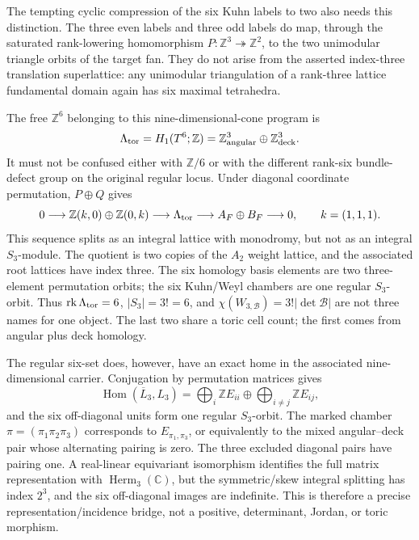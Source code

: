 \documentclass[10pt,letterpaper]{article}
\begin{document}
The tempting cyclic compression of the six Kuhn labels to two also needs this
distinction.  The three even labels and three odd labels do map, through the
saturated rank-lowering homomorphism \(P:\mathbb Z^3\twoheadrightarrow
\mathbb Z^2\), to the two unimodular triangle orbits of the target fan.  They
do not arise from the asserted index-three translation superlattice: any
unimodular triangulation of a rank-three lattice fundamental domain again has
six maximal tetrahedra.

The free \(\mathbb Z^6\) belonging to this nine-dimensional-cone program is
\[
 \Lambda_{\rm tor}=H_1(T^6;\mathbb Z)
 =\mathbb Z^3_{\rm angular}\oplus\mathbb Z^3_{\rm deck}.
\]
It must not be confused either with \(\mathbb Z/6\) or with the different
rank-six bundle-defect group on the original regular locus.  Under diagonal
coordinate permutation, \(P\oplus Q\) gives
\[
 0\longrightarrow\mathbb Z(k,0)\oplus\mathbb Z(0,k)
 \longrightarrow\Lambda_{\rm tor}
 \longrightarrow A_F\oplus B_F\longrightarrow0,
 \qquad k=(1,1,1).
\]
This sequence splits as an integral lattice with monodromy, but not as an
integral \(S_3\)-module.  The quotient is two copies of the \(A_2\) weight
lattice, and the associated root lattices have index three.  The six homology
basis elements are two three-element permutation orbits; the six Kuhn/Weyl
chambers are one regular \(S_3\)-orbit.  Thus
\(\operatorname{rk}\Lambda_{\rm tor}=6\), \(|S_3|=3!=6\), and
\(\chi(W_{3,\mathcal B})=3!|\det\mathcal B|\) are not three names for one
object.  The last two share a toric cell count; the first comes from angular
plus deck homology.

The regular six-set does, however, have an exact home in the associated
nine-dimensional carrier.  Conjugation by permutation matrices gives
\[
 \operatorname{Hom}(\overline L_3,L_3)
 =\bigoplus_i\mathbb ZE_{ii}\oplus
  \bigoplus_{i\ne j}\mathbb ZE_{ij},
\]
and the six off-diagonal units form one regular \(S_3\)-orbit.  The marked
chamber \(\pi=(\pi_1\pi_2\pi_3)\) corresponds to
\(E_{\pi_1,\pi_3}\), or equivalently to the mixed angular--deck pair whose
alternating pairing is zero.  The three excluded diagonal pairs have pairing
one.  A real-linear equivariant isomorphism identifies the full matrix
representation with \(\operatorname{Herm}_3(\mathbb C)\), but the
symmetric/skew integral splitting has index \(2^3\), and the six
off-diagonal images are indefinite.  This is therefore a precise
representation/incidence bridge, not a positive, determinant, Jordan, or
toric morphism.
\end{document}
